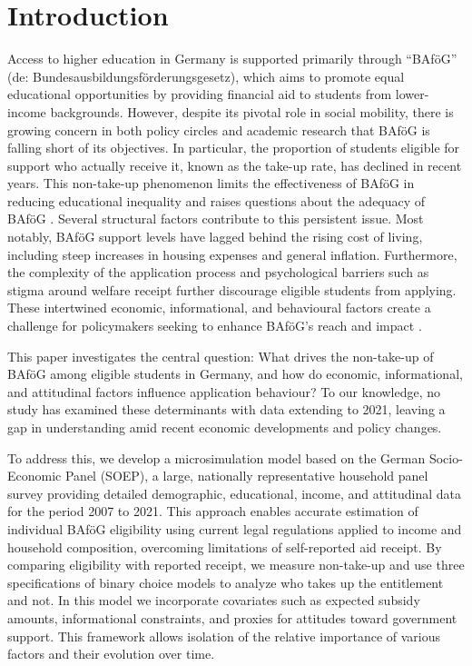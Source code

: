 \section{Introduction} \label{sec:intro}

Access to higher education in Germany is supported primarily through ``BAföG'' (de: Bundesausbildungsförderungsgesetz), which aims to promote equal educational opportunities by providing financial aid to students from lower-income backgrounds. 
However, despite its pivotal role in social mobility, there is growing concern in both policy circles and academic research that BAföG is falling short of its objectives. 
In particular, the proportion of students eligible for support who actually receive it, known as the take-up rate, has declined in recent years. 
This non-take-up phenomenon limits the effectiveness of BAföG in reducing educational inequality and raises questions about the adequacy of BAföG \citep{gwosc_krisenbewaltigung_2022, meier_bafog_2024}. 
Several structural factors contribute to this persistent issue. 
Most notably, BAföG support levels have lagged behind the rising cost of living, including steep increases in housing expenses and general inflation.
Furthermore, the complexity of the application process and psychological barriers such as stigma around welfare receipt further discourage eligible students from applying. 
These intertwined economic, informational, and behavioural factors create a challenge for policymakers seeking to enhance BAföG’s reach and impact \citep{meier_bafog_2024, staack_von_2017}.

This paper investigates the central question: What drives the non-take-up of BAföG among eligible students in Germany, and how do economic, informational, and attitudinal factors influence application behaviour? 
To our knowledge, no study has examined these determinants with data extending to 2021, leaving a gap in understanding amid recent economic developments and policy changes.

To address this, we develop a microsimulation model based on the German Socio-Economic Panel (SOEP), a large, nationally representative household panel survey providing detailed demographic, educational, income, and attitudinal data for the period 2007 to 2021.
This approach enables accurate estimation of individual BAföG eligibility using current legal regulations applied to income and household composition, overcoming limitations of self-reported aid receipt. 
By comparing eligibility with reported receipt, we measure non-take-up and use three specifications of binary choice models to analyze who takes up the entitlement and not. In this model we incorporate covariates such as expected subsidy amounts, informational constraints, and proxies for attitudes toward government support. 
This framework allows isolation of the relative importance of various factors and their evolution over time.

